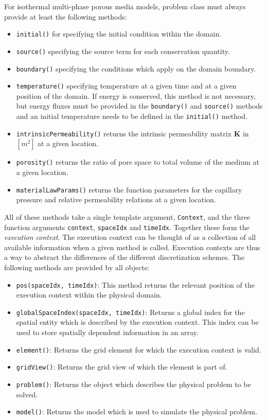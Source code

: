 For isothermal multi-phase porous media models, problem class must always provide at least
the following methods:
\begin{itemize}
\item \texttt{initial()} for specifying the initial condition within
  the domain.
\item \texttt{source()} specifying the source term for each conservation quantity.
\item \texttt{boundary()} specifying the conditions which apply on the domain boundary.
\item \texttt{temperature()} specifying temperature at a given time
  and at a given position of the domain. If energy is conserved, this
  method is not necessary, but energy fluxes must be provided in the
  \texttt{boundary()} and \texttt{source()} methods and an initial
  temperature needs to be defined in the \texttt{initial()} method.
\item \texttt{intrinsicPermeability()} returns the intrinsic
  permeability matrix $\mathbf{K}$ in $[m^2]$ at a given location.
\item \texttt{porosity()} returns the ratio of pore space to
  total volume of the medium at a given location.
\item \texttt{materialLawParams()} returns the function parameters for
  the capillary pressure and relative permeability relations at a
  given location.
\end{itemize}

All of these methods take a single template argument,
\texttt{Context}, and the three function arguments \texttt{context},
\texttt{spaceIdx} and \texttt{timeIdx}. Together these form the
\textit{execution context}. The execution context can be thought of as
a collection of all available information when a given method is
called. Execution contexts are thus a way to abstract the differences
of the different discretization schemes. The following methods are
provided by all  objects:
\begin{itemize}
\item \texttt{pos(spaceIdx, timeIdx)}: This method returns the
  relevant position of the execution context within the physical
  domain.
\item \texttt{globalSpaceIndex(spaceIdx, timeIdx)}: Returns a global
  index for the spatial entity which is described by the execution
  context. This index can be used to store spatially dependent
  information in an array.
\item \texttt{element()}: Returns the \Dune grid element for which the
  execution context is valid.
\item \texttt{gridView()}: Returns the \Dune grid view of which the
  element is part of.
\item \texttt{problem()}: Returns the \eWoms object which describes
  the physical problem to be solved.
\item \texttt{model()}: Returns the \eWoms model which is used to simulate
  the physical problem.
\end{itemize}

